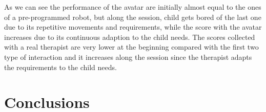 \documentclass[12pt,journal,draftclsnofoot,onecolumn]{IEEEtran}
\begin{document}
As we can see the performance of the avatar are initially almost equal to the ones of a pre-programmed robot, but along the session, child gets bored of the last one due to its repetitive movements and requirements, while the score with the avatar increases due to its continuous adaption to the child needs.
The scores collected with a real therapist are very lower at the beginning compared with the first two type of interaction and it increases along the session since the therapist adapts the requirements to the child needs.

\section{Conclusions}\label{sec:conclusions}



\end{document}
